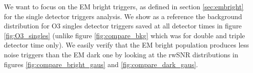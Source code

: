 % 
% 



We want to focus on the EM bright triggers, as defined in section \ref{sec:embright} for the single detector triggers analysis.
We show as a reference the background distribution for O3 singles detector triggers saved at all detector times in figure \ref{fig:O3_singles} (unlike figure \ref{fig:compare_bkg} which was for double and triple detector time only).
We easily verify that the EM bright population produces less noise triggers than the EM dark one by looking at the rwSNR distributions in figures \ref{fig:compare_bright_gaus} and \ref{fig:compare_dark_gaus}.

